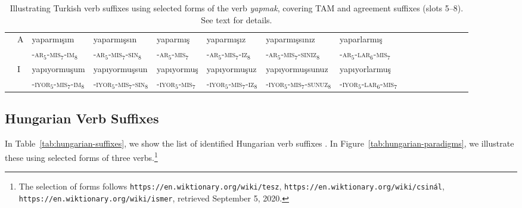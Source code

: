 \documentclass[11pt,letterpaper]{article}
\begin{document}
\begin{table}
{\begin{tabular}{ll||lll|lllllllllll}
               & A & yaparmışım &	yaparmışsın &	yaparmış &	yaparmışız &	yaparmışsınız& 	yaparlarmış \\ 
            &  & -\textsc{ar}$_5$-\textsc{mis}$_7$-\textsc{im}$_8$ &	-\textsc{ar}$_5$-\textsc{mis}$_7$-\textsc{sin}$_8$ &	-\textsc{ar}$_5$-\textsc{mis}$_7$ &	-\textsc{ar}$_5$-\textsc{mis}$_7$-\textsc{iz}$_8$ &	-\textsc{ar}$_5$-\textsc{mis}$_7$-\textsc{siniz}$_8$& 	-\textsc{ar}$_5$-\textsc{lar}$_6$-\textsc{mis}$_7$ \\ \hline
               & I & yapıyormuşum &	yapıyormuşsun &	yapıyormuş &	yapıyormuşuz &	yapıyormuşsunuz &	yapıyorlarmuş \\
	       &              & -\textsc{iyor}$_5$-\textsc{mis}$_7$-\textsc{im}$_8$ &	-\textsc{iyor}$_5$-\textsc{mis}$_7$-\textsc{sin}$_8$ &	-\textsc{iyor}$_5$-\textsc{mis}$_7$ &	-\textsc{iyor}$_5$-\textsc{mis}$_7$-\textsc{iz}$_8$ &	-\textsc{iyor}$_5$-\textsc{mis}$_7$-\textsc{sunuz}$_8$ &	-\textsc{iyor}$_5$-\textsc{lar}$_6$-\textsc{mis}$_7$ \\
\end{tabular}
}
	\caption{Illustrating Turkish verb suffixes using selected forms of the verb \textit{yapmak}, covering TAM and agreement suffixes (slots 5--8). See text for details.}\label{tab:turkish-yapmak}
\end{table}




\subsection{Hungarian Verb Suffixes}


In Table~\ref{tab:hungarian-suffixes}, we show the list of identified Hungarian verb suffixes \citep{rounds2001hungarian}.
In Figure~\ref{tab:hungarian-paradigms}, we illustrate these using selected forms of three verbs.\footnote{The selection of forms follows \texttt{https://en.wiktionary.org/wiki/tesz},
\texttt{https://en.wiktionary.org/wiki/csinál},
\texttt{https://en.wiktionary.org/wiki/ismer}, retrieved September 5, 2020.}
\end{document}
